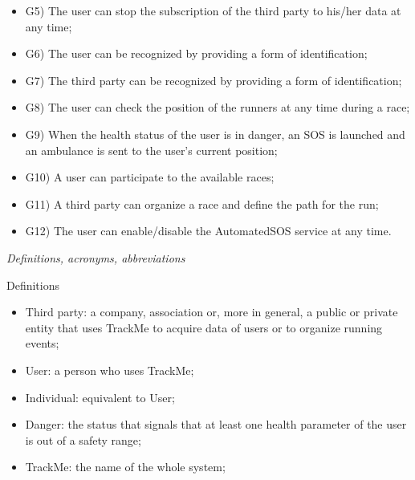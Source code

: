\documentclass{article}
\begin{document}
\begin{legal}
\begin{legal}
\begin{legal}
{\begin{itemize}
				\item G5) The user can stop the subscription of the third party to his/her data at any time;\\
				\item G6) The user can be recognized by providing a form of identification;\\
				\item G7) The third party can be recognized by providing a form of identification;\\
				\item G8) The user can check the position of the runners at any time during a race;\\
				\item G9) When the health status of the user is in danger, an SOS is launched and an ambulance is sent to the user’s current position;\\
				\item G10) A user can participate to the available races;\\
				\item G11) A third party can organize a race and define the path for the run;\\
				\item G12) The user can enable/disable the AutomatedSOS service at any time.\\
				\end{itemize}
			}
			\end{legal}
		\item \textit{Definitions, acronyms, abbreviations}\\
			\begin{legal}
			\item Definitions\\
			{\normalfont
				\begin{itemize}
				\item Third party: a company, association or, more in general, a public or private entity that uses TrackMe to acquire data of users or to organize running events;\\
				\item User: a person who uses TrackMe;\\
				\item Individual: equivalent to User;\\
				\item Danger: the status that signals that at least one health parameter of the user is out of a safety range;\\
				\item TrackMe: the name of the whole system;\\

\end{itemize}}
\end{legal}
\end{legal}
\end{legal}
\end{document}
